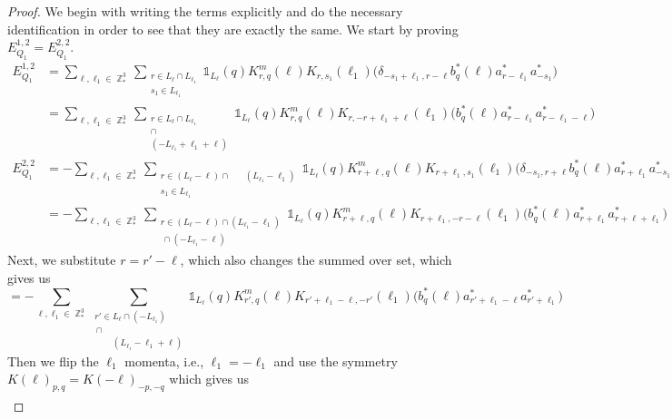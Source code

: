 \documentclass[sn-mathphys, Numbered ,a4paper]{sn-jnl}%
\DeclareMathOperator{\Z}{\mathbb{Z}}
\theoremstyle{plain}
\theoremstyle{definition}
\theoremstyle{remark}
\theoremstyle{plain}
\theoremstyle{definition}
\theoremstyle{remark}
\begin{document}
\begin{proof}
	We begin with writing the terms explicitly and do the necessary identification in order to see that they are exactly the same.
	We start by proving $E_{Q_1}^{1,2}=E_{Q_1}^{2,2}$.
	\begin{align}
		E_{Q_1}^{1,2} &={\sum\limits_{\ell, \ell_1\in \Z^3_*}\sum\limits_{\substack{r \in L_{\ell}\cap  L_{\ell_1}\\s_1\in L_{\ell_1}}} \!\!\! \mathds{1}_{L_\ell}(q) K^{m}_{r,q}(\ell) K_{r,s_1}(\ell_1)\Big( 
			\delta_{-s_1+\ell_1,r-\ell} b^*_{q}(\ell) a^*_{r-\ell_1} a^*_{-s_1} \Big)\nonumber}\\
		&=\sum\limits_{\ell, \ell_1\in \Z^3_*}\sum\limits_{\substack{r \in L_{\ell}\cap  L_{\ell_1}\\ \cap \\(-L_{\ell_1}+\ell_1+\ell)}} \!\!\! \mathds{1}_{L_\ell}(q) K^{m}_{r,q}(\ell) K_{r,-r+\ell_1+\ell}(\ell_1)\Big( b^*_{q}(\ell) a^*_{r-\ell_1} a^*_{r-\ell_1-\ell} \Big)\label{eq:EQ112}\\
		E_{Q_1}^{2,2} &= -\sum\limits_{\ell, \ell_1\in \Z^3_*}\sum\limits_{\substack{r \in  (L_{\ell}-\ell)  \cap \phantom{r\in}  (L_{\ell_1}-\ell_1) \\ s_1 \in L_{\ell_1}}} \!\!\!\! \mathds{1}_{L_\ell}(q) K^{m}_{r+\ell,q}(\ell)
		K_{r+\ell_1,s_1}(\ell_1)\Big(\delta_{-s_1,r+\ell} b^*_{q}(\ell) a^*_{r+\ell_1}a^*_{-s_1+\ell_1}\Big) \nonumber\\
		&=-\sum\limits_{\ell, \ell_1\in \Z^3_*}\sum\limits_{\substack{r \in  (L_{\ell}-\ell) \cap (L_{\ell_1}-\ell_1) \\ \, \cap   (-L_{\ell_1}-\ell)}} \!\!\!\! \mathds{1}_{L_\ell}(q) K^{m}_{r+\ell,q}(\ell)
		K_{r+\ell_1,-r-\ell}(\ell_1)\Big( b^*_{q}(\ell) a^*_{r+\ell_1}a^*_{r+\ell+\ell_1}\Big)  
	\end{align}
	Next, we substitute $r = r'-\ell $, which also changes the summed over set, which gives us
	\begin{equation}
		=-\sum\limits_{\ell, \ell_1\in \Z^3_*}\sum\limits_{\substack{r' \in  L_{\ell} \cap (-L_{\ell_1}) \\ \, \cap\\ \phantom{r'\in}  (L_{\ell_1}-\ell_1+\ell)}} \!\!\!\! \mathds{1}_{L_\ell}(q) K^{m}_{r',q}(\ell)
		K_{r'+\ell_1-\ell,-r'}(\ell_1)\Big( b^*_{q}(\ell) a^*_{r'+\ell_1-\ell}a^*_{r'+\ell_1}\Big) 
	\end{equation}
	Then we flip the $\ell_1$ momenta, i.e., $\ell_1 = -\ell_1$ and use the symmetry $K(\ell)_{p,q} = K(-\ell)_{-p,-q}$ which gives us
	\begin{align}

\end{align}
\end{proof}
\end{document}
